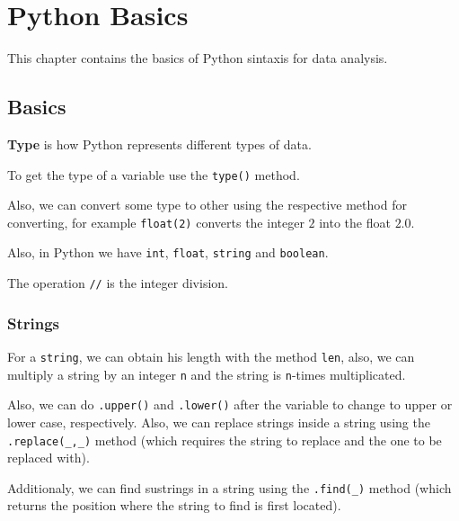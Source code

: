 \documentclass[../../data_analysis_python.tex]{subfiles}
\begin{document}
    \chapter{Python Basics}

    This chapter contains the basics of Python sintaxis for data analysis.

    \section{Basics}

    \begin{mydef}
        \textbf{Type} is how Python represents different types of data.
    \end{mydef}

    \begin{obs}
        To get the type of a variable use the \lstinline|type()| method.
    \end{obs}

    Also, we can convert some type to other using the respective method for converting, for example \lstinline|float(2)| converts the integer $2$ into the float $2.0$.

    Also, in Python we have \lstinline|int|, \lstinline|float|, \lstinline|string| and \lstinline|boolean|.

    \begin{obs}
        The operation \lstinline|//| is the integer division.
    \end{obs}

    \subsection{Strings}

    For a \lstinline|string|, we can obtain his length with the method \lstinline|len|, also, we can multiply a string by an integer \lstinline|n| and the string is \lstinline|n|-times multiplicated.

    Also, we can do \lstinline|.upper()| and \lstinline|.lower()| after the variable to change to upper or lower case, respectively. Also, we can replace strings inside a string using the \lstinline|.replace(_,_)| method (which requires the string to replace and the one to be replaced with).

    Additionaly, we can find sustrings in a string using the \lstinline|.find(_)| method (which returns the position where the string to find is first located).
\end{document}

